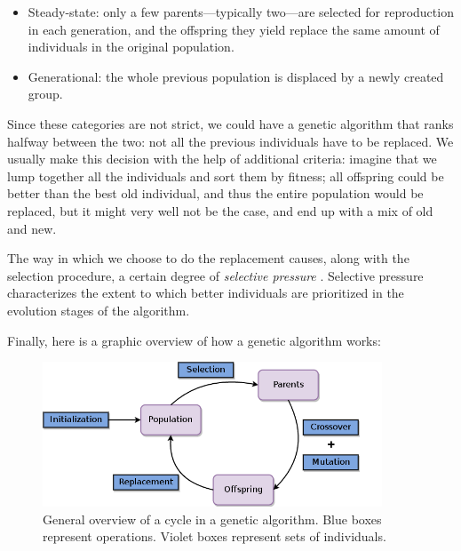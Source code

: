 		\begin{itemize}

			\item
			Steady-state: only a few parents---typically two---are selected for reproduction in each generation, and the offspring they yield replace the same amount of individuals in the original population.

			\item
			Generational: the whole previous population is displaced by a newly created group.

		\end{itemize}

		Since these categories are not strict, we could have a genetic algorithm that ranks halfway between the two: not all the previous individuals have to be replaced. We usually make this decision with the help of additional criteria: imagine that we lump together all the individuals and sort them by fitness; all offspring could be better than the best old individual, and thus the entire population would be replaced, but it might very well not be the case, and end up with a mix of old and new.

		The way in which we choose to do the replacement causes, along with the selection procedure, a certain degree of \textit{selective pressure} \cite{selection-ga}. Selective pressure characterizes the extent to which better individuals are prioritized in the evolution stages of the algorithm.

		Finally, here is a graphic overview of how a genetic algorithm works:

		\vspace{0.2cm}

	    \begin{figure}[bth]

	        \myfloatalign
	        \includegraphics[width=0.9\textwidth]{gfx/GeneticAlgorithm.png}
	        \caption{General overview of a cycle in a genetic algorithm. Blue boxes represent operations. Violet boxes represent sets of individuals.}

	    \end{figure}

